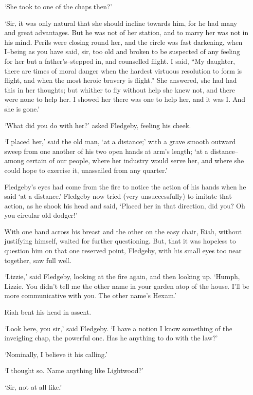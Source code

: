 ‘She took to one of the chaps then?’

‘Sir, it was only natural that she should incline towards him, for he
had many and great advantages. But he was not of her station, and to
marry her was not in his mind. Perils were closing round her, and the
circle was fast darkening, when I--being as you have said, sir, too
old and broken to be suspected of any feeling for her but a
father’s--stepped in, and counselled flight. I said, “My daughter, there
are times of moral danger when the hardest virtuous resolution to form
is flight, and when the most heroic bravery is flight.” She answered,
she had had this in her thoughts; but whither to fly without help she
knew not, and there were none to help her. I showed her there was one to
help her, and it was I. And she is gone.’

‘What did you do with her?’ asked Fledgeby, feeling his cheek.

‘I placed her,’ said the old man, ‘at a distance;’ with a grave smooth
outward sweep from one another of his two open hands at arm’s length;
‘at a distance--among certain of our people, where her industry would
serve her, and where she could hope to exercise it, unassailed from any
quarter.’

Fledgeby’s eyes had come from the fire to notice the action of his hands
when he said ‘at a distance.’ Fledgeby now tried (very unsuccessfully)
to imitate that action, as he shook his head and said, ‘Placed her in
that direction, did you? Oh you circular old dodger!’

With one hand across his breast and the other on the easy chair, Riah,
without justifying himself, waited for further questioning. But, that it
was hopeless to question him on that one reserved point, Fledgeby, with
his small eyes too near together, saw full well.

‘Lizzie,’ said Fledgeby, looking at the fire again, and then looking up.
‘Humph, Lizzie. You didn’t tell me the other name in your garden atop of
the house. I’ll be more communicative with you. The other name’s Hexam.’

Riah bent his head in assent.

‘Look here, you sir,’ said Fledgeby. ‘I have a notion I know something
of the inveigling chap, the powerful one. Has he anything to do with the
law?’

‘Nominally, I believe it his calling.’

‘I thought so. Name anything like Lightwood?’

‘Sir, not at all like.’

